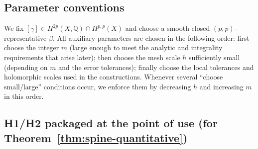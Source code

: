 \documentclass[11pt]{article}
\numberwithin{equation}{section}  %
\theoremstyle{plain}
\theoremstyle{definition}
\theoremstyle{remark}
\newcommand{\Q}{\mathbb{Q}}
\begin{document}
\subsection*{Parameter conventions}
\label{sec:parameter-schedule}
We fix $[\gamma]\in H^{2p}(X,\Q)\cap H^{p,p}(X)$ and choose a smooth closed $(p,p)$-representative $\beta$.
All auxiliary parameters are chosen in the following order: first choose the integer $m$ (large enough to meet the
analytic and integrality requirements that arise later); then choose the mesh scale $h$ sufficiently small (depending on $m$
and the error tolerances); finally choose the local tolerances and holomorphic scales used in the constructions.
Whenever several ``choose small/large'' conditions occur, we enforce them by decreasing $h$ and increasing $m$ in this order.

\subsection*{H1/H2 packaged at the point of use (for Theorem~\ref{thm:spine-quantitative})}
\end{document}

